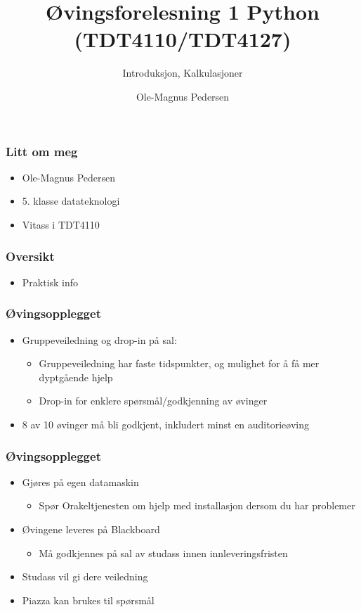 \documentclass[screen, aspectratio=169]{beamer}
\title[Short title]{Øvingsforelesning 1 Python (TDT4110/TDT4127)}
\subtitle{Introduksjon, Kalkulasjoner}
\author[O.M. Pedersen]{Ole-Magnus Pedersen}
\institute[NTNU]{}
\date{}
\begin{document}
\begin{frame}
  \titlepage
\end{frame}


\begin{frame}
  \frametitle{Litt om meg}
  \begin{itemize}
  	\item Ole-Magnus Pedersen
  	\item  5. klasse datateknologi
  	\item Vitass i TDT4110
  \end{itemize}
\end{frame}

\begin{frame}
	\frametitle{Oversikt}
	\begin{itemize}
		\item Praktisk info
	\end{itemize}
\end{frame}

\begin{frame}
	\frametitle{Øvingsopplegget}
	\begin{itemize}
		\item Gruppeveiledning og drop-in på sal:
		\begin{itemize}
		    \item Gruppeveiledning har faste tidspunkter, og mulighet for å få mer dyptgående hjelp
		    \item Drop-in for enklere spørsmål/godkjenning av øvinger
		\end{itemize}
		\item 8 av 10 øvinger må bli godkjent, inkludert minst en auditorieøving
	\end{itemize}
\end{frame}

\begin{frame}
	\frametitle{Øvingsopplegget}
	\begin{itemize}
		\item Gjøres på egen datamaskin
		\begin{itemize}
			\item Spør Orakeltjenesten om hjelp med installasjon dersom du har problemer
		\end{itemize}
		\item Øvingene leveres på Blackboard
		\begin{itemize}
			\item Må godkjennes på sal av studass innen innleveringsfristen
		\end{itemize}
		\item Studass vil gi dere veiledning
		\item Piazza kan brukes til spørsmål
	\end{itemize}
\end{frame}
\end{document}
